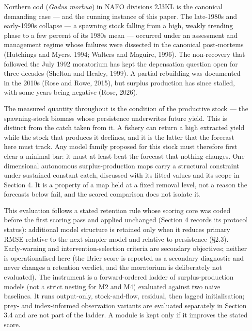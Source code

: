 \documentclass[11pt]{article}
\begin{document}
Northern cod (\emph{Gadus morhua}) in NAFO divisions 2J3KL is the
canonical demanding case --- and the running instance of this paper. The late-1980s and early-1990s collapse --- a
spawning stock falling from a high, weakly trending phase to a few
percent of its 1980s mean --- occurred under an assessment and
management regime whose failures were dissected in the canonical
post-mortems (Hutchings and Myers, 1994; Walters and Maguire, 1996). The
non-recovery that followed the July 1992 moratorium has kept the
depensation question open for three decades (Shelton and Healey, 1999).
A partial rebuilding was documented in the 2010s (Rose and Rowe, 2015),
but surplus production has since stalled, with some years being negative
(Rose, 2026).

The measured quantity throughout is the condition of the productive
stock --- the spawning-stock biomass whose persistence underwrites
future yield. This is distinct from the catch taken from it. A fishery
can return a high extracted yield while the stock that produces it
declines, and it is the latter that the forecast here must track. Any
model family proposed for this stock must therefore first clear a
minimal bar: it must at least beat the forecast that nothing changes.
One-dimensional autonomous surplus-production maps carry a structural
constraint under sustained constant catch, discussed with its fitted
values and its scope in Section 4. It is a property of a map held at a
fixed removal level, not a reason the forecasts below fail, and the
scored comparison does not isolate it.

This evaluation follows a stated retention rule whose scoring core was
coded before the first scoring pass and applied unchanged (Section 4 records its protocol
status): additional model structure is retained only when it reduces
primary RMSE relative to the next-simpler model and relative to
persistence (\S{}2.3). Early-warning and intervention-selection criteria
are secondary objectives; neither is operationalised here (the
Brier score is reported as a secondary diagnostic and never changes a
retention verdict, and the moratorium is deliberately not evaluated).
The instrument is a forward-ordered ladder of surplus-production models
(not a strict nesting for M2 and M4) evaluated against two naive
baselines. It runs output-only, stock-and-flow, residual, then lagged initialisation;
prey- and index-informed observation variants are evaluated separately
in Section 3.4 and are not part of the ladder. A module is kept only if
it improves the stated score.
\end{document}
